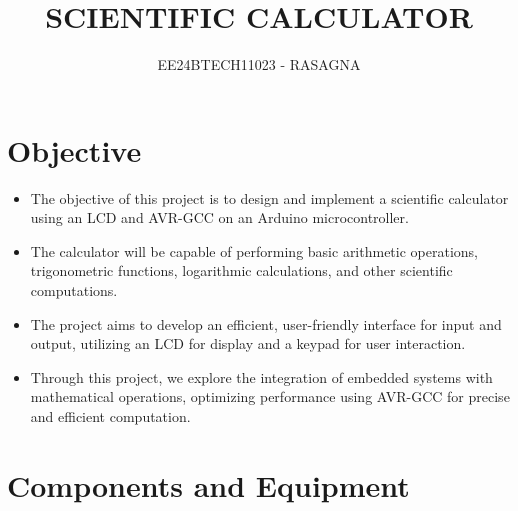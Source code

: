 \documentclass[journal]{IEEEtran}
\begin{document}

\vspace{3cm}

\title{SCIENTIFIC CALCULATOR}
\author{EE24BTECH11023 - RASAGNA}

{\let\newpage\relax\maketitle}

\renewcommand{\thefigure}{\theenumi}
\renewcommand{\thetable}{\theenumi}
\setlength{\intextsep}{10pt} %


\renewcommand{\thetable}{\theenumi}

\section{Objective}
\begin{itemize}
    \item The objective of this project is to design and implement a scientific calculator using an LCD and AVR-GCC on an Arduino microcontroller.
    \item The calculator will be capable of performing basic arithmetic operations, trigonometric functions, logarithmic calculations, and other scientific computations.
    \item The project aims to develop an efficient, user-friendly interface for input and output, utilizing an LCD for display and a keypad for user interaction.
    \item Through this project, we explore the integration of embedded systems with mathematical operations, optimizing performance using AVR-GCC for precise and efficient computation.
\end{itemize}


\section{Components and Equipment}
\end{document}
